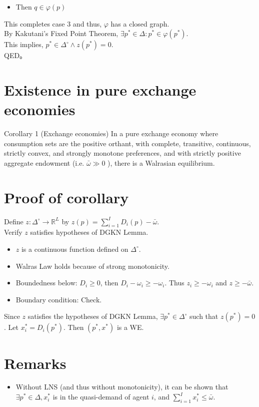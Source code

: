 \documentclass[10pt]{article}
\begin{document}
\begin{itemize}
  \item Then $q \in \varphi(p)$
\end{itemize}

This completes case 3 and thus, $\varphi$ has a closed graph.\\
By Kakutani's Fixed Point Theorem, $\exists p^{*} \in \Delta: p^{*} \in \varphi\left(p^{*}\right)$.\\
This implies, $p^{*} \in \Delta^{\circ} \wedge z\left(p^{*}\right)=0$.\\
QED。

\section*{Existence in pure exchange economies}
Corollary 1 (Exchange economies) In a pure exchange economy where consumption sets are the positive orthant, with complete, transitive, continuous, strictly convex, and strongly monotone preferences, and with strictly positive aggregate endowment (i.e. $\bar{\omega} \gg 0$ ), there is a Walrasian equilibrium.

\section*{Proof of corollary}
Define $z: \Delta^{\circ} \rightarrow \mathbb{R}^{L}$ by $z(p)=\sum_{i=1}^{I} D_{i}(p)-\bar{\omega}$.\\
Verify $z$ satisfies hypotheses of DGKN Lemma.

\begin{itemize}
  \item $z$ is a continuous function defined on $\Delta^{\circ}$.
  \item Walras Law holds because of strong monotonicity.
  \item Boundedness below: $D_{i} \geq 0$, then $D_{i}-\omega_{i} \geq-\omega_{i}$. Thus $z_{i} \geq-\omega_{i}$ and $z \geq-\bar{\omega}$.
  \item Boundary condition: Check.
\end{itemize}

Since $z$ satisfies the hypotheses of DGKN Lemma, $\exists p^{*} \in \Delta^{\circ}$ such that $z\left(p^{*}\right)=0$. Let $x_{i}^{*}=D_{i}\left(p^{*}\right)$. Then $\left(p^{*}, x^{*}\right)$ is a WE.

\section*{Remarks}
\begin{itemize}
  \item Without LNS (and thus without monotonicity), it can be shown that $\exists p^{*} \in \Delta, x_{i}^{*}$ is in the quasi-demand of agent $i$, and $\sum_{i=1}^{I} x_{i}^{*} \leq \bar{\omega}$.
\end{itemize}
\end{document}
